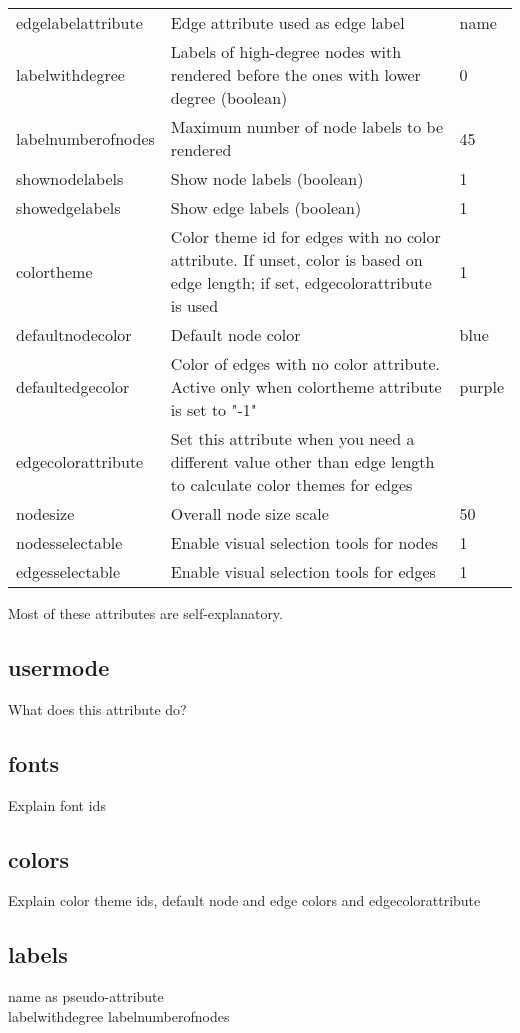 \begin{center}
{\begin{tabular}[t]{|l|p{2.5in}|l|}
edgelabelattribute & Edge attribute used as edge label & name \\
labelwithdegree & Labels of high-degree nodes with 
rendered before the ones with lower degree (boolean) & 0 \\
labelnumberofnodes & Maximum number of node labels to be 
rendered & 45 \\
shownodelabels & Show node labels (boolean) & 1 \\
showedgelabels & Show edge labels (boolean) & 1 \\
colortheme & Color theme id for edges with no 
color attribute. If unset, color is based on edge length; if
set, edgecolorattribute is used & 1 \\
defaultnodecolor & Default node color & blue \\
defaultedgecolor & Color of edges with no color attribute. Active only when 
colortheme attribute is set to "-1" & purple \\
edgecolorattribute & Set this attribute when you need a 
different value other than edge length to calculate color themes for edges & \\
nodesize & Overall node size scale & 50 \\ 
nodesselectable & Enable visual selection tools for nodes & 1 \\
edgesselectable & Enable visual selection tools for edges & 1 \\ \hline
\end{tabular}
}
\end{center}
Most of these attributes are self-explanatory. 

\subsection{usermode}
What does this attribute do?

\subsection{fonts}
Explain font ids

\subsection{colors}
Explain color theme ids, default node and edge colors
and edgecolorattribute

\subsection{labels}
name as pseudo-attribute \\
labelwithdegree labelnumberofnodes

